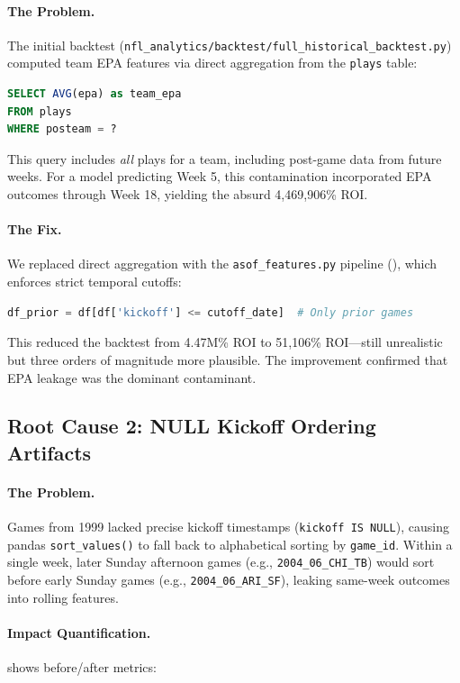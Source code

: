 \paragraph{The Problem.}
The initial backtest (\texttt{nfl\_analytics/backtest/full\_historical\_backtest.py}) computed team EPA features via direct aggregation from the \texttt{plays} table:
\begin{lstlisting}[language=SQL,basicstyle=\ttfamily\scriptsize]
SELECT AVG(epa) as team_epa
FROM plays
WHERE posteam = ?
\end{lstlisting}

This query includes \emph{all} plays for a team, including post-game data from future weeks. For a model predicting Week 5, this contamination incorporated EPA outcomes through Week 18, yielding the absurd 4,469,906\% ROI.

\paragraph{The Fix.}
We replaced direct aggregation with the \texttt{asof\_features.py} pipeline (), which enforces strict temporal cutoffs:
\begin{lstlisting}[language=Python,basicstyle=\ttfamily\scriptsize]
df_prior = df[df['kickoff'] <= cutoff_date]  # Only prior games
\end{lstlisting}

This reduced the backtest from 4.47M\% ROI to 51,106\% ROI---still unrealistic but three orders of magnitude more plausible. The improvement confirmed that EPA leakage was the dominant contaminant.

\subsection{Root Cause 2: NULL Kickoff Ordering Artifacts}

\paragraph{The Problem.}
Games from 1999 lacked precise kickoff timestamps (\texttt{kickoff IS NULL}), causing pandas \texttt{sort\_values()} to fall back to alphabetical sorting by \texttt{game\_id}. Within a single week, later Sunday afternoon games (e.g., \texttt{2004\_06\_CHI\_TB}) would sort before early Sunday games (e.g., \texttt{2004\_06\_ARI\_SF}), leaking same-week outcomes into rolling features.

\paragraph{Impact Quantification.}
 shows before/after metrics:

